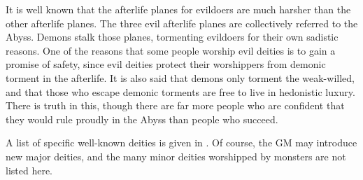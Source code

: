     It is well known that the afterlife planes for evildoers are much harsher than the other afterlife planes.
    The three evil afterlife planes are collectively referred to the Abyss.
    Demons stalk those planes, tormenting evildoers for their own sadistic reasons.
    One of the reasons that some people worship evil deities is to gain a promise of safety, since evil deities protect their worshippers from demonic torment in the afterlife.
    It is also said that demons only torment the weak-willed, and that those who escape demonic torments are free to live in hedonistic luxury.
    There is truth in this, though there are far more people who are confident that they would rule proudly in the Abyss than people who succeed.

    A list of specific well-known deities is given in .
    Of course, the GM may introduce new major deities, and the many minor deities worshipped by monsters are not listed here.

